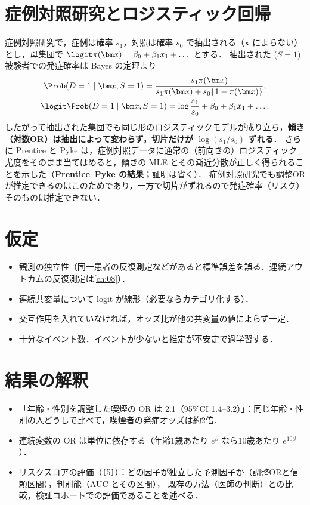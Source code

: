 \section{症例対照研究とロジスティック回帰}\label{sec:06-cc}
症例対照研究で，症例は確率 $s_1$，対照は確率 $s_0$ で抽出される（$\bm x$ によらない）とし，母集団で $\logit\pi(\bm x)=\beta_0+\beta_1x_1+\dots$ とする．
抽出された ($S=1$) 被験者での発症確率は Bayes の定理より
\begin{gather*}
\Prob(D=1\mid\bm x,S=1)=\frac{s_1\pi(\bm x)}{s_1\pi(\bm x)+s_0\{1-\pi(\bm x)\}},\\
\logit\Prob(D=1\mid\bm x,S=1)=\log\frac{s_1}{s_0}+\beta_0+\beta_1x_1+\dots.
\end{gather*}
したがって抽出された集団でも同じ形のロジスティックモデルが成り立ち，\textbf{傾き（対数OR）は抽出によって変わらず，切片だけが $\log(s_1/s_0)$ ずれる}．
さらに Prentice と Pyke は，症例対照データに通常の（前向きの）ロジスティック尤度をそのまま当てはめると，傾きの MLE とその漸近分散が正しく得られることを示した（\textbf{Prentice--Pyke の結果}；証明は省く）．
症例対照研究でも調整ORが推定できるのはこのためであり，一方で切片がずれるので発症確率（リスク）そのものは推定できない．

\section{仮定}\label{sec:06-assump}
\begin{itemize}
\item 観測の独立性（同一患者の反復測定などがあると標準誤差を誤る．連続アウトカムの反復測定は\cref{ch:08}）．
\item 連続共変量について logit が線形（必要ならカテゴリ化する）．
\item 交互作用を入れていなければ，オッズ比が他の共変量の値によらず一定．
\item 十分なイベント数．イベントが少ないと推定が不安定で過学習する．
\end{itemize}

\section{結果の解釈}\label{sec:06-interp}
\begin{itemize}
\item 「年齢・性別を調整した喫煙の OR は 2.1（95\%CI 1.4--3.2）」：同じ年齢・性別の人どうしで比べて，喫煙者の発症オッズは約2倍．
\item 連続変数の OR は単位に依存する（年齢1歳あたり $e^{\beta}$ なら10歳あたり $e^{10\beta}$）．
\item リスクスコアの評価（〔5〕）：どの因子が独立した予測因子か（調整ORと信頼区間），判別能（AUC とその区間），
      既存の方法（医師の判断）との比較，検証コホートでの評価であることを述べる．
\end{itemize}


